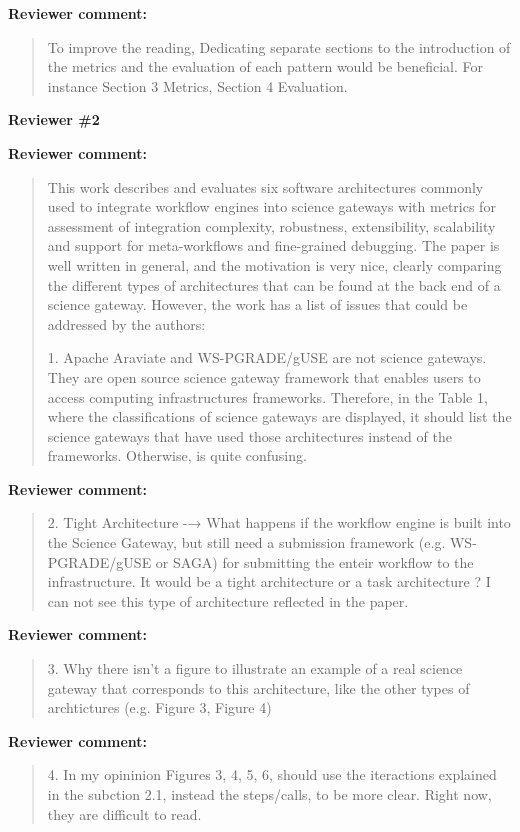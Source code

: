 \documentclass[a4]{letter}
\newenvironment{review}%
{\textbf{Reviewer comment:}\begin{quote}}%
{\end{quote}}%
\begin{document}
\begin{letter}{}
\begin{review}
To improve the reading, Dedicating separate sections to the introduction of the metrics and the evaluation of each pattern would be beneficial. For instance Section 3 Metrics, Section 4 Evaluation.
\end{review}

\textbf{Reviewer \#2}

\begin{review}
  This work describes and evaluates six software architectures
  commonly used to integrate workflow engines into science gateways
  with metrics for assessment of integration complexity, robustness,
  extensibility, scalability and support for meta-workflows and
  fine-grained debugging. The paper is well written in general, and
  the motivation is very nice, clearly comparing the different types
  of architectures that can be found at the back end of a science
  gateway. However, the work has a list of issues that could be
  addressed by the authors:

1. Apache Araviate and WS-PGRADE/gUSE are not science gateways. They
are open source science gateway framework that enables users to access
computing infrastructures frameworks. Therefore, in the Table 1, where
the classifications of science gateways are displayed, it should list
the science gateways that have used those architectures instead of the
frameworks. Otherwise, is quite confusing.
\end{review}

\begin{review}
  2. Tight Architecture -→ What happens if the workflow engine is
  built into the Science Gateway, but still need a submission
  framework (e.g. WS-PGRADE/gUSE or SAGA) for submitting the enteir
  workflow to the infrastructure.  It would be a tight architecture or
  a task architecture ? I can not see this type of architecture
  reflected in the paper.
\end{review}

\begin{review}
  3. Why there isn't a figure to illustrate an example of a real
  science gateway that corresponds to this architecture, like the
  other types of archtictures (e.g. Figure 3, Figure 4)
\end{review}

\begin{review}
  4. In my opininion Figures 3, 4, 5, 6, should use the iteractions
  explained in the subction 2.1, instead the steps/calls, to be more
  clear. Right now, they are difficult to read.
\end{review}


\end{letter}
\end{document}
